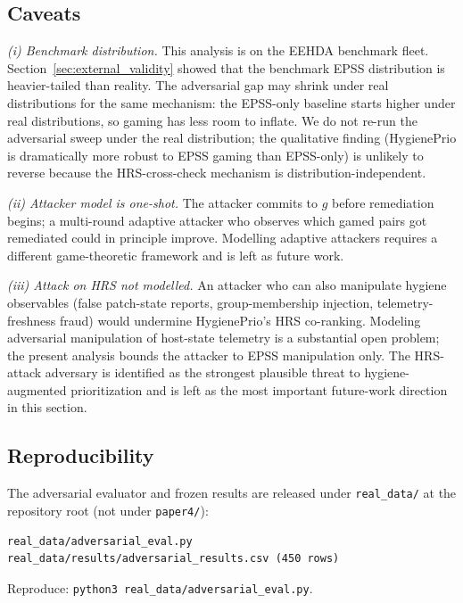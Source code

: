 \subsection{Caveats}

\textit{(i) Benchmark distribution.} This analysis is on the EEHDA
benchmark fleet. Section~\ref{sec:external_validity} showed that the
benchmark EPSS distribution is heavier-tailed than reality. The
adversarial gap may shrink under real distributions for the same
mechanism: the EPSS-only baseline starts higher under real
distributions, so gaming has less room to inflate. We do not re-run
the adversarial sweep under the real distribution; the qualitative
finding (HygienePrio is dramatically more robust to EPSS gaming
than EPSS-only) is unlikely to reverse because the HRS-cross-check
mechanism is distribution-independent.

\textit{(ii) Attacker model is one-shot.} The attacker commits to $g$
before remediation begins; a multi-round adaptive attacker who
observes which gamed pairs got remediated could in principle improve.
Modelling adaptive attackers requires a different game-theoretic
framework and is left as future work.

\textit{(iii) Attack on HRS not modelled.} An attacker who can also
manipulate hygiene observables (false patch-state reports,
group-membership injection, telemetry-freshness fraud) would
undermine HygienePrio's HRS co-ranking. Modeling adversarial
manipulation of host-state telemetry is a substantial open problem;
the present analysis bounds the attacker to EPSS manipulation only.
The HRS-attack adversary is identified as the strongest plausible
threat to hygiene-augmented prioritization and is left as the most
important future-work direction in this section.

\subsection{Reproducibility}

The adversarial evaluator and frozen results are released under
\texttt{real\_data/} at the repository root (not under
\texttt{paper4/}):
{\footnotesize\begin{verbatim}
real_data/adversarial_eval.py
real_data/results/adversarial_results.csv (450 rows)
\end{verbatim}}
Reproduce: \texttt{python3 real\_data/\allowbreak adversarial\_eval.py}.
